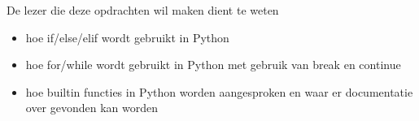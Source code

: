 De lezer die deze opdrachten wil maken dient te weten
\begin{itemize}
\item hoe if/else/elif wordt gebruikt in Python
\item hoe for/while wordt gebruikt in Python met gebruik van break en continue
\item hoe builtin functies in Python worden aangesproken en waar er documentatie over gevonden kan worden
\end{itemize}
